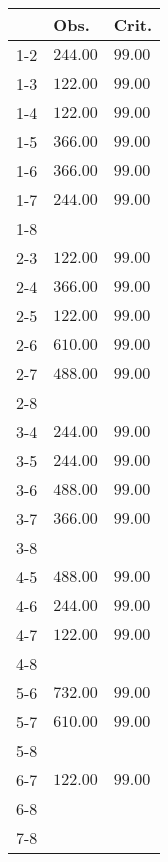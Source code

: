 \begin{table}[ht]
\centering
\begin{tabular}{rll}
  \hline
 & Obs. & Crit. \\ 
  \hline
1-2 & \(\mathbf{244.00}\) & \(\mathbf{99.00}\) \\ 
  1-3 & \(\mathbf{122.00}\) & \(\mathbf{99.00}\) \\ 
  1-4 & \(\mathbf{122.00}\) & \(\mathbf{99.00}\) \\ 
  1-5 & \(\mathbf{366.00}\) & \(\mathbf{99.00}\) \\ 
  1-6 & \(\mathbf{366.00}\) & \(\mathbf{99.00}\) \\ 
  1-7 & \(\mathbf{244.00}\) & \(\mathbf{99.00}\) \\ 
  1-8 &  &  \\ 
  2-3 & \(\mathbf{122.00}\) & \(\mathbf{99.00}\) \\ 
  2-4 & \(\mathbf{366.00}\) & \(\mathbf{99.00}\) \\ 
  2-5 & \(\mathbf{122.00}\) & \(\mathbf{99.00}\) \\ 
  2-6 & \(\mathbf{610.00}\) & \(\mathbf{99.00}\) \\ 
  2-7 & \(\mathbf{488.00}\) & \(\mathbf{99.00}\) \\ 
  2-8 &  &  \\ 
  3-4 & \(\mathbf{244.00}\) & \(\mathbf{99.00}\) \\ 
  3-5 & \(\mathbf{244.00}\) & \(\mathbf{99.00}\) \\ 
  3-6 & \(\mathbf{488.00}\) & \(\mathbf{99.00}\) \\ 
  3-7 & \(\mathbf{366.00}\) & \(\mathbf{99.00}\) \\ 
  3-8 &  &  \\ 
  4-5 & \(\mathbf{488.00}\) & \(\mathbf{99.00}\) \\ 
  4-6 & \(\mathbf{244.00}\) & \(\mathbf{99.00}\) \\ 
  4-7 & \(\mathbf{122.00}\) & \(\mathbf{99.00}\) \\ 
  4-8 &  &  \\ 
  5-6 & \(\mathbf{732.00}\) & \(\mathbf{99.00}\) \\ 
  5-7 & \(\mathbf{610.00}\) & \(\mathbf{99.00}\) \\ 
  5-8 &  &  \\ 
  6-7 & \(\mathbf{122.00}\) & \(\mathbf{99.00}\) \\ 
  6-8 &  &  \\ 
  7-8 &  &  \\ 
   \hline
\end{tabular}
\end{table}
